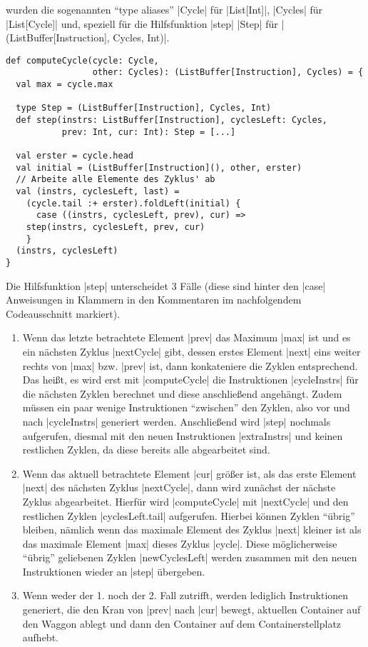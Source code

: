 wurden die sogenannten ``type aliases'' |Cycle| für |List[Int]|, |Cycles| für |List[Cycle]| und,
speziell für die Hilfsfunktion |step| |Step| für |(ListBuffer[Instruction], Cycles, Int)|.
\begin{lstlisting}
def computeCycle(cycle: Cycle,
                 other: Cycles): (ListBuffer[Instruction], Cycles) = {
  val max = cycle.max

  type Step = (ListBuffer[Instruction], Cycles, Int)
  def step(instrs: ListBuffer[Instruction], cyclesLeft: Cycles,
           prev: Int, cur: Int): Step = [...]

  val erster = cycle.head
  val initial = (ListBuffer[Instruction](), other, erster)
  // Arbeite alle Elemente des Zyklus' ab
  val (instrs, cyclesLeft, last) =
    (cycle.tail :+ erster).foldLeft(initial) {
      case ((instrs, cyclesLeft, prev), cur) =>
	step(instrs, cyclesLeft, prev, cur)
    }
  (instrs, cyclesLeft)
}
\end{lstlisting}
Die Hilfsfunktion |step| unterscheidet 3 Fälle (diese sind hinter den |case| Anweisungen in Klammern in den Kommentaren im nachfolgendem Codeausschnitt markiert).
\begin{enumerate}
 \item Wenn das letzte betrachtete Element |prev| das Maximum |max| ist und es ein nächsten Zyklus |nextCycle| gibt,
       dessen erstes Element |next| eins weiter rechts von |max| bzw. |prev| ist, dann konkateniere die Zyklen entsprechend.
       Das heißt, es wird erst mit |computeCycle| die Instruktionen |cycleInstrs| für die nächsten Zyklen berechnet
       und diese anschließend angehängt. Zudem müssen ein paar wenige Instruktionen ``zwischen'' den Zyklen,
       also vor und nach |cycleInstrs| generiert werden. Anschließend wird |step| nochmals aufgerufen,
       diesmal mit den neuen Instruktionen |extraInstrs| und keinen restlichen Zyklen, da diese bereits alle abgearbeitet sind.
 \item Wenn das aktuell betrachtete Element |cur| größer ist, als das erste Element |next| des nächsten Zyklus |nextCycle|,
       dann wird zunächst der nächste Zyklus abgearbeitet.
       Hierfür wird |computeCycle| mit |nextCycle| und den restlichen Zyklen |cyclesLeft.tail| aufgerufen.
       Hierbei können Zyklen ``übrig'' bleiben,
       nämlich wenn das maximale Element des Zyklus |next| kleiner ist als das maximale Element |max| dieses Zyklus |cycle|.
       Diese möglicherweise ``übrig'' geliebenen Zyklen |newCyclesLeft| werden zusammen mit den neuen Instruktionen wieder an |step| übergeben.
 \item Wenn weder der 1. noch der 2. Fall zutrifft, werden lediglich Instruktionen generiert,
       die den Kran von |prev| nach |cur| bewegt, aktuellen Container auf den Waggon ablegt und dann den Container auf dem Containerstellplatz aufhebt.
\end{enumerate}

